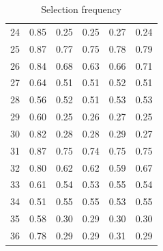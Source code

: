 \documentclass[authoryear, review, 11pt]{elsarticle}
\begin{document}
\begin{table}[ht]
\begin{center}
\begin{tabular}{rrrrrr}
  24 & 0.85 & 0.25 & 0.25 & 0.27 & 0.24 \\ 
  25 & 0.87 & 0.77 & 0.75 & 0.78 & 0.79 \\ 
  26 & 0.84 & 0.68 & 0.63 & 0.66 & 0.71 \\ 
  27 & 0.64 & 0.51 & 0.51 & 0.52 & 0.51 \\ 
  28 & 0.56 & 0.52 & 0.51 & 0.53 & 0.53 \\ 
  29 & 0.60 & 0.25 & 0.26 & 0.27 & 0.25 \\ 
  30 & 0.82 & 0.28 & 0.28 & 0.29 & 0.27 \\ 
  31 & 0.87 & 0.75 & 0.74 & 0.75 & 0.75 \\ 
  32 & 0.80 & 0.62 & 0.62 & 0.59 & 0.67 \\ 
  33 & 0.61 & 0.54 & 0.53 & 0.55 & 0.54 \\ 
  34 & 0.51 & 0.55 & 0.55 & 0.53 & 0.55 \\ 
  35 & 0.58 & 0.30 & 0.29 & 0.30 & 0.30 \\ 
  36 & 0.78 & 0.29 & 0.29 & 0.31 & 0.29 \\ 
   \hline
\end{tabular}
\caption{Selection frequency}
\end{center}
\end{table}
\end{document}
